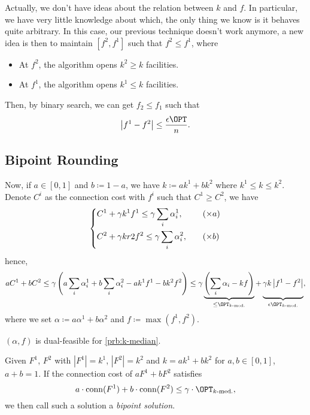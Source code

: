 Actually, we don't have ideas about the relation between \(k\) and \(f\). In particular, we have very little knowledge about which, the only thing we know is it behaves quite arbitrary. In this case, our previous technique doesn't work anymore, a new idea is then to maintain \([f^2, f^1]\) such that \(f^2 \leq f^1\), where
\begin{itemize}
	\item At \(f^2\), the algorithm opens \(k^2 \geq k\) facilities.
	\item At \(f^1\), the algorithm opens \(k^1 \leq k\) facilities.
\end{itemize}
Then, by binary search, we can get \(f_2 \leq f_1\) such that
\[
	\left\vert f^1 - f^2 \right\vert \leq \frac{\epsilon \OPT}{n}.
\]

\subsection{Bipoint Rounding}

Now, if \(a\in [0, 1]\) and \(b \coloneqq 1 - a\), we have \(k \coloneqq ak^1 + bk^2\) where \(k^1 \leq k \leq k^2\). Denote \(C^i\) as the connection cost with \(f^i\) such that \(C^1 \geq C^2\), we have
\[
	\begin{dcases}
		C^1 + \gamma k^1 f^1 \leq \gamma \sum_{i} \alpha _i^1, & \quad (\times a) \\
		C^2 + \gamma kr2 f^2 \leq \gamma \sum_{i} \alpha _i^2, & \quad (\times b)
	\end{dcases}
\]
hence,
\[
	aC^1 + bC^2
	\leq \gamma \left( a \sum_{i} \alpha _i^1 + b \sum_{i} \alpha _i^2 - ak^1 f^1 - bk^2 f^2 \right)
	\leq \gamma \underbrace{\left( \sum_{i} \alpha _i - kf \right)}_{\leq \OPT_{\text{\(k\)-med.}}} + \underbrace{\vphantom{\left( \sum_{i} \alpha _i - kf \right)}\gamma k \left\vert f^1 - f^2 \right\vert}_{\epsilon \OPT_{\text{\(k\)-med.}}},
\]
where we set \(\alpha \coloneqq a \alpha ^1 + b \alpha ^2\) and \(f \coloneqq \max (f^1, f^2)\).

\begin{note}
	\((\alpha , f)\) is dual-feasible for \autoref{prb:k-median}.
\end{note}

\begin{definition}\label{def:bipoint-solution}
	Given \(F^1\), \(F^2\) with \(\left\vert F^1 \right\vert = k^1\), \(\left\vert F^2 \right\vert = k^2\) and \(k=ak^1 + bk^2\) for \(a, b\in [0, 1]\), \(a + b = 1\). If the connection cost of \(aF^1 + b F^2\) satisfies
	\[
		a\cdot \mathop{\mathrm{conn}}(F^1) + b\cdot \mathop{\mathrm{conn}}(F^2) \leq \gamma \cdot \OPT_{\text{\(k\)-med.}},
	\]
	we then call such a solution a \emph{bipoint solution}.
\end{definition}

